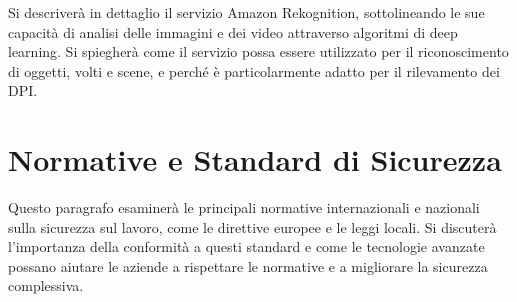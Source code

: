 Si descriverà in dettaglio il servizio Amazon Rekognition, sottolineando le sue capacità di analisi delle immagini e dei video attraverso algoritmi di deep learning. Si spiegherà come il servizio possa essere utilizzato per il riconoscimento di oggetti, volti e scene, e perché è particolarmente adatto per il rilevamento dei DPI.

\section{Normative e Standard di Sicurezza}

Questo paragrafo esaminerà le principali normative internazionali e nazionali sulla sicurezza sul lavoro, come le direttive europee e le leggi locali. Si discuterà l'importanza della conformità a questi standard e come le tecnologie avanzate possano aiutare le aziende a rispettare le normative e a migliorare la sicurezza complessiva.
